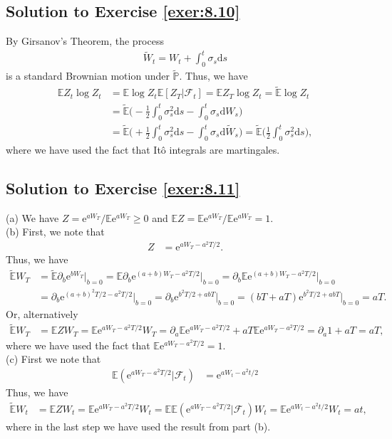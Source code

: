 \documentclass[12pt]{book}
\numberwithin{equation}{chapter}
\theoremstyle{plain}
\numberwithin{theorem}{section}
\theoremstyle{definition}
\numberwithin{exercise}{chapter}
\newcommand{\<}{\langle}
\renewcommand{\>}{\rangle}
\renewcommand{\(}{\left(}
\renewcommand{\)}{\right)}
\renewcommand{\[}{\left[}
\renewcommand{\]}{\right]}
\newcommand\Eb{\mathds{E}}
\newcommand\Pb{\mathds{P}}
\newcommand\Fc{\mathscr{F}}
\newcommand\Ebt{\widetilde{\Eb}}
\newcommand\Pbt{\widetilde{\Pb}}
\renewcommand\d{\partial}
\newcommand\dd{\mathrm{d}}
\newcommand\ee{\mathrm{e}}
\begin{document}
\subsection*{Solution to Exercise \ref{exer:8.10}}
By Girsanov's Theorem, the process
\begin{align}
\widetilde{W}_t = W_t + \int_0^t \sigma_s \dd s
\end{align}
is a standard Brownian motion under $\Pbt$.  Thus, we have
\begin{align}
\Eb Z_t \log Z_t
	&=	\Eb \log Z_t \Eb[ Z_T | \Fc_t] 
	=		\Eb Z_T \log Z_t 
	=		\Ebt \log Z_t \\
	&=	\Ebt \Big( -\frac{1}{2}\int_0^t\sigma_s^2 \dd s - \int_0^t \sigma_s \dd W_s \Big) \\
	&=	\Ebt \Big(+\frac{1}{2}\int_0^t\sigma_s^2 \dd s - \int_0^t \sigma_s \dd \widetilde{W}_s \Big)
	=		\Ebt \Big(\frac{1}{2}\int_0^t \sigma_s^2 \dd s \Big) ,
\end{align}
where we have used the fact that It\^o integrals are martingales.

\subsection*{Solution to Exercise \ref{exer:8.11}}
(a) We have $Z = \ee^{a W_T}/ \Eb \ee^{a W_T} \geq 0$ and $\Eb Z = \Eb \ee^{a W_T} / \Eb \ee^{a W_T} = 1$.
\\[0.5em]
(b) First, we note that
\begin{align}
Z
	&=	\ee^{a W_T - a^2 T / 2} .
\end{align}
Thus, we have
\begin{align}
\Ebt W_T
	&=	\Ebt \d_b \ee^{b W_T} \Big|_{b=0}
	=		\Eb \d_b \ee^{(a + b) W_T - a^2 T / 2} \Big|_{b=0}
	=		\d_b \Eb \ee^{(a + b) W_T - a^2 T / 2} \Big|_{b=0} \\
	&=		\d_b \ee^{( a + b )^2 T / 2 - a^2 T / 2} \Big|_{b=0} 
	=		\d_b \ee^{b^2 T / 2 + a b T} \Big|_{b=0}
	=		( b T + a T ) \ee^{b^2 T / 2 + a b T} \Big|_{b=0}
	=		a T .
\end{align}
Or, alternatively
\begin{align}
\Ebt W_T
	&=	\Eb Z W_T
	=		\Eb \ee^{a W_T - a^2 T / 2} W_T
	=		\d_a \Eb \ee^{a W_T - a^2 T / 2} + a T \Eb \ee^{a W_T - a^2 T / 2}
	=		\d_a 1 + a T
	=		a T ,
\end{align}
where we have used the fact that $\Eb \ee^{a W_T - a^2 T / 2} = 1$.
\\[0.5em]
(c) First we note that
\begin{align}
\Eb( \ee^{a W_T - a^2 T / 2} | \Fc_t ) 
	&=	\ee^{a W_t - a^2 t / 2}
\end{align}
Thus, we have
\begin{align}
\Ebt W_t
	&=	\Eb Z W_t
	=		\Eb \ee^{a W_T - a^2 T / 2} W_t
	=		\Eb \Eb( \ee^{a W_T - a^2 T / 2} | \Fc_t) W_t
	=		\Eb \ee^{a W_t - a^2 t / 2} W_t
	=		a t ,
\end{align}
where in the last step we have used the result from part (b).
\end{document}

